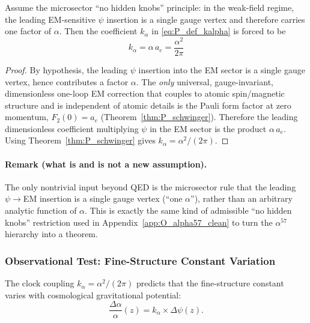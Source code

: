 \begin{theorem}\label{thm:P_kalpha}
Assume the microsector ``no hidden knobs'' principle: in the weak-field regime, the leading EM-sensitive 
$\psi$ insertion is a single gauge vertex and therefore carries one factor of $\alpha$.
Then the coefficient $k_\alpha$ in \eqref{eq:P_def_kalpha} is forced to be
\begin{equation}
\boxed{k_\alpha = \alpha\,a_e = \frac{\alpha^2}{2\pi}}
\end{equation}
\end{theorem}

\begin{proof}
By hypothesis, the leading $\psi$ insertion into the EM sector is a single gauge vertex, hence contributes a factor $\alpha$.
The \emph{only} universal, gauge-invariant, dimensionless one-loop EM correction that couples to atomic spin/magnetic 
structure and is independent of atomic details is the Pauli form factor at zero momentum, $F_2(0)=a_e$ (Theorem~\ref{thm:P_schwinger}).
Therefore the leading dimensionless coefficient multiplying $\psi$ in the EM sector is the product $\alpha\,a_e$.
Using Theorem~\ref{thm:P_schwinger} gives $k_\alpha=\alpha^2/(2\pi)$.
\end{proof}

\paragraph{Remark (what is and is not a new assumption).}
The only nontrivial input beyond QED is the microsector rule that the leading $\psi\!\to\!$EM insertion is a 
single gauge vertex (``one $\alpha$''), rather than an arbitrary analytic function of $\alpha$.
This is exactly the same kind of admissible ``no hidden knobs'' restriction used in Appendix~\ref{app:O_alpha57_clean} 
to turn the $\alpha^{57}$ hierarchy into a theorem.

\subsubsection{Observational Test: Fine-Structure Constant Variation}\label{sec:P_espresso}

The clock coupling $k_\alpha = \alpha^2/(2\pi)$ predicts that the fine-structure constant varies with 
cosmological gravitational potential:
\begin{equation}
\frac{\Delta\alpha}{\alpha}(z) = k_\alpha \times \Delta\psi(z).
\end{equation}

